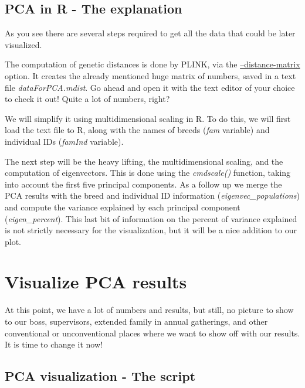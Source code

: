 \documentclass[]{book}
\begin{document}
\subsection{PCA in R - The
explanation}\label{pca-in-r---the-explanation}

As you see there are several steps required to get all the data that
could be later visualized.

The computation of genetic distances is done by PLINK, via the
\href{https://www.cog-genomics.org/plink/1.9/distance\#ibs_matrix}{--distance-matrix}
option. It creates the already mentioned huge matrix of numbers, saved
in a text file \emph{dataForPCA.mdist}. Go ahead and open it with the
text editor of your choice to check it out! Quite a lot of numbers,
right?

We will simplify it using multidimensional scaling in R. To do this, we
will first load the text file to R, along with the names of breeds
(\emph{fam} variable) and individual IDs (\emph{famInd} variable).

The next step will be the heavy lifting, the multidimensional scaling,
and the computation of eigenvectors. This is done using the
\emph{cmdscale()} function, taking into account the first five principal
components. As a follow up we merge the PCA results with the breed and
individual ID information (\emph{eigenvec\_populations}) and compute the
variance explained by each principal component (\emph{eigen\_percent}).
This last bit of information on the percent of variance explained is not
strictly necessary for the visualization, but it will be a nice addition
to our plot.

\section{Visualize PCA results}\label{visualize-pca-results}

At this point, we have a lot of numbers and results, but still, no
picture to show to our boss, supervisors, extended family in annual
gatherings, and other conventional or unconventional places where we
want to show off with our results. It is time to change it now!

\subsection{PCA visualization - The
script}\label{pca-visualization---the-script}
\end{document}
